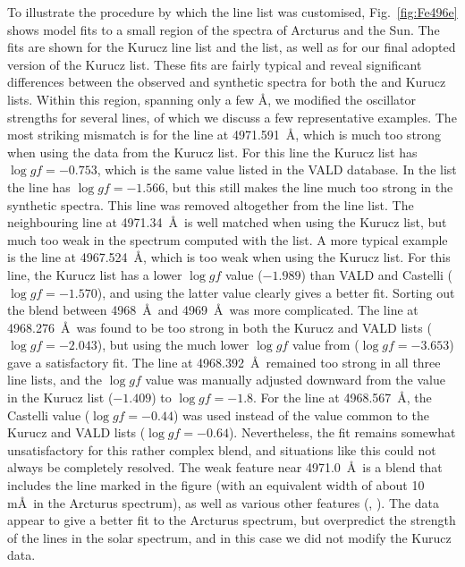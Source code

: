 \documentclass{aa}
\begin{document}
To illustrate the procedure by which the line list was customised, 
Fig.~\ref{fig:Fe496e} shows model fits to a small region of the spectra of Arcturus and the Sun. The fits are shown for the Kurucz line list and the  list, as well as for our final adopted version of the Kurucz list. These fits are fairly typical and reveal significant differences between the observed and synthetic spectra for both the  and Kurucz lists. 
Within this region, spanning only a few \AA , we modified the oscillator strengths for several lines, of which we discuss a few representative examples. 
The most striking mismatch is for the  line at 4971.591~\AA, which is much too strong when using the data from the Kurucz list.
For this line the Kurucz list has $\log gf = -0.753$, which is the same value listed in the VALD database. In the  list the line has $\log gf = -1.566$, but this still makes the line much too strong in the synthetic spectra. This line was removed altogether from the line list. 
The neighbouring  line at 4971.34~\AA\ is well matched when using the Kurucz list, but much too weak in the spectrum computed with the  list. 
A more typical example is the  line at 4967.524~\AA, which is too weak when using the Kurucz list. For this line, the Kurucz list has a lower $\log gf$ value ($-1.989$) than VALD and Castelli ($\log gf = -1.570$), and using the latter value clearly gives a better fit. 
Sorting out the blend between 4968~\AA\ and 4969~\AA\ was more complicated. The  line at 4968.276~\AA\ was found to be too strong in both the Kurucz and VALD lists ($\log gf = -2.043$), but using the much lower $\log gf$ value from   ($\log gf = -3.653$) gave a satisfactory fit.  The  line at 4968.392~\AA\ remained too strong in all three line lists, and the $\log gf$ value was manually adjusted downward from the value in the Kurucz list ($-1.409$) to $\log gf = -1.8$. For the  line at 4968.567~\AA, the Castelli value ($\log gf = -0.44$) was used instead of the value common to the Kurucz and VALD lists ($\log gf = -0.64$). Nevertheless, the fit remains somewhat unsatisfactory for this rather complex blend, and situations like this could not always be completely resolved. 
The weak feature near 4971.0~\AA\ is a blend that includes the  line marked in the figure (with an equivalent width of about 10 m\AA\ in the Arcturus spectrum), as well as various other features (, ). The  data appear to give a better fit to the Arcturus spectrum, but overpredict the strength of the lines in the solar spectrum, and in this case we did not modify the Kurucz data.
\end{document}
